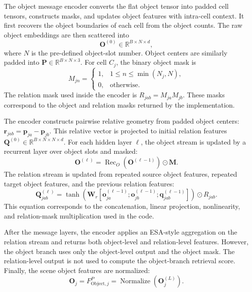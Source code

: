 \documentclass{article}
\begin{document}
The object message encoder converts the flat object tensor into padded cell tensors, constructs masks, and updates object features with intra-cell context. It first recovers the object boundaries of each cell from the object counts. The raw object embeddings are then scattered into
\begin{equation}
\mathbf{O}^{(0)}\in\mathbb{R}^{B\times N\times d},
\end{equation}
where $N$ is the pre-defined object-slot number. Object centers are similarly padded into $\mathbf{P}\in\mathbb{R}^{B\times N\times 3}$. For cell $C_j$, the binary object mask is
\begin{equation}
M_{jn}=\begin{cases}
1,& 1\leq n\leq \min(N_j,N),\\
0,& \text{otherwise}.
\end{cases}
\end{equation}
The relation mask used inside the encoder is $R_{jab}=M_{ja}M_{jb}$. These masks correspond to the object and relation masks returned by the implementation.

The encoder constructs pairwise relative geometry from padded object centers: $\mathbf{r}_{jab}=\mathbf{p}_{ja}-\mathbf{p}_{jb}$. This relative vector is projected to initial relation features $\mathbf{Q}^{(0)}\in\mathbb{R}^{B\times N\times N\times d}$. For each hidden layer $\ell$, the object stream is updated by a recurrent layer over object slots and masked:
\begin{equation}
\mathbf{O}^{(\ell)}=\operatorname{Rec}_{O}(\mathbf{O}^{(\ell-1)})\odot \mathbf{M}.
\end{equation}
The relation stream is updated from repeated source object features, repeated target object features, and the previous relation features:
\begin{equation}
\mathbf{Q}_{jab}^{(\ell)}=\tanh\left(\mathbf{W}_{r}[\mathbf{o}_{ja}^{(\ell-1)};\mathbf{o}_{jb}^{(\ell-1)};\mathbf{q}_{jab}^{(\ell-1)}]\right)\odot R_{jab}.
\end{equation}
This equation corresponds to the concatenation, linear projection, nonlinearity, and relation-mask multiplication used in the code.

After the message layers, the encoder applies an ESA-style aggregation on the relation stream and returns both object-level and relation-level features. However, the object branch uses only the object-level output and the object mask. The relation-level output is not used to compute the object-branch retrieval score. Finally, the scene object features are normalized:
\begin{equation}
\mathbf{O}_j=F_{\mathrm{Object},j}^{P}=\operatorname{Normalize}(\mathbf{O}^{(L)}_j).
\end{equation}
\end{document}
